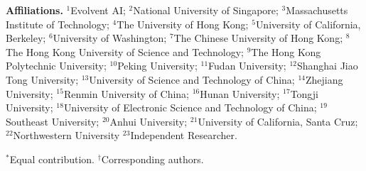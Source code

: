 \noindent\textbf{Affiliations.}
$^{1}$Evolvent AI;
$^{2}$National University of Singapore;
$^{3}$Massachusetts Institute of Technology;
$^{4}$The University of Hong Kong;
$^{5}$University of California, Berkeley;
$^{6}$University of Washington;
$^{7}$The Chinese University of Hong Kong;
$^{8}$The Hong Kong University of Science and Technology;
$^{9}$The Hong Kong Polytechnic University;
$^{10}$Peking University;
$^{11}$Fudan University;
$^{12}$Shanghai Jiao Tong University;
$^{13}$University of Science and Technology of China;
$^{14}$Zhejiang University;
$^{15}$Renmin University of China;
$^{16}$Hunan University;
$^{17}$Tongji University;
$^{18}$University of Electronic Science and Technology of China;
$^{19}$Southeast University;
$^{20}$Anhui University;
$^{21}$University of California, Santa Cruz;
$^{22}$Northwestern University
$^{23}$Independent Researcher.

\medskip

\noindent\footnotesize{$^{*}$Equal contribution. $^{\dagger}$Corresponding authors.}
